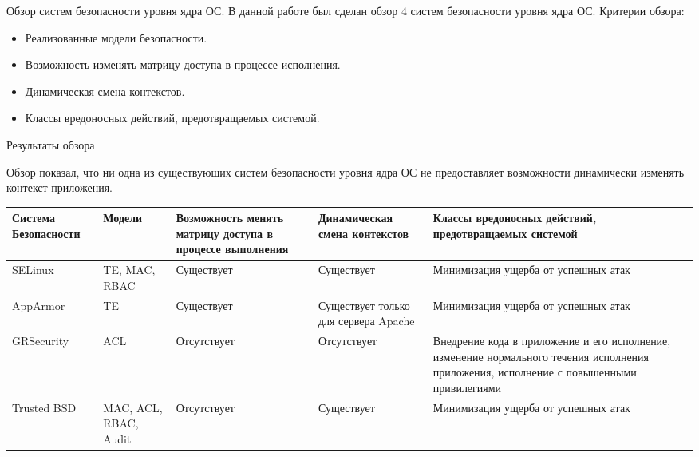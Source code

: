 \documentclass{beamer}
\begin{document}
\begin{frame}{Обзор систем безопасности уровня ядра ОС.}
В данной работе был сделан обзор 4 систем безопасности уровня ядра ОС.
Критерии обзора:

\begin{itemize}
 \item Реализованные модели безопасности.
 \item Возможность изменять матрицу доступа в процессе исполнения.
 \item Динамическая смена контекстов.
 \item Классы вредоносных действий, предотвращаемых системой.
\end{itemize}
\end{frame}

\begin{frame}[fragile]{Результаты обзора}

Обзор показал, что ни одна из существующих систем безопасности
уровня ядра ОС не предоставляет возможности динамически изменять
контекст приложения.

\begin{tiny}
\begin{center}
\begin{tabular}{|p{2cm}|p{1.5cm}|p{2cm}|p{2cm}|p{2cm}|} 
\hline
Система Безопасности & Модели & Возможность менять матрицу 
доступа в процессе выполнения & 
Динамическая смена контекстов & Классы вредоносных действий,
предотвращаемых системой \\
\hline 
SELinux & TE, MAC, RBAC & Существует & Существует & 
Минимизация ущерба от успешных атак \\
\hline
AppArmor & TE & Существует & Существует только для сервера Apache & 
Минимизация ущерба от успешных атак \\ 
\hline 
GRSecurity & ACL & Отсутствует & Отсутствует & Внедрение кода в приложение 
и его исполнение, изменение нормального течения исполнения приложения, 
исполнение с повышенными привилегиями \\ 
\hline 
Trusted BSD & MAC, ACL, RBAC, Audit & Отсутствует & Существует & 
Минимизация ущерба от успешных атак \\ 
\hline
\end{tabular} 
\end{center} 
\end{tiny} 
 
\end{frame}
\end{document}
